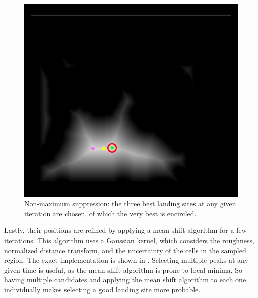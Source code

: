 \documentclass{article}
\begin{document}
\begin{figure}[ht!]
    \centering
    \includegraphics[scale=0.5]{images/system_overview/non_max_suppression.png}
    \caption{Non-maximum suppression: the three best landing sites at any given iteration are chosen, of which the very best is encircled.}
    \label{fig:non_max_sup}
\end{figure}

Lastly, their positions are refined by applying a mean shift algorithm for a few iterations. This algorithm uses a Gaussian kernel, which considers the roughness, normalized distance transform, and the uncertainty of the cells in the sampled region. The exact implementation is shown in \citet{LSD2}. Selecting multiple peaks at any given time is useful, as the mean shift algorithm is prone to local minima. So having multiple candidates and applying the mean shift algorithm to each one individually makes selecting a good landing site more probable.
\end{document}
